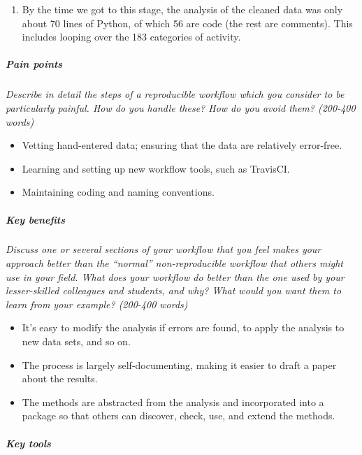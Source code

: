\documentclass[]{article}
\begin{document}
\begin{enumerate}
  \begin{enumerate}
  \def\labelenumii{\roman{enumii}.}
  \itemsep1pt\parskip0pt
  \item
    By the time we got to this stage, the analysis of the cleaned data
    was only about 70 lines of Python, of which 56 are code (the rest
    are comments). This includes looping over the 183 categories of
    activity.
  \end{enumerate}
\end{enumerate}

\subparagraph{Pain points}\label{pain-points}

\emph{Describe in detail the steps of a reproducible workflow which you
consider to be particularly painful. How do you handle these? How do you
avoid them? (200-400 words)}

\begin{itemize}
\itemsep1pt\parskip0pt
\item
  Vetting hand-entered data; ensuring that the data are relatively
  error-free.
\item
  Learning and setting up new workflow tools, such as TravisCI.
\item
  Maintaining coding and naming conventions.
\end{itemize}

\subparagraph{Key benefits}\label{key-benefits}

\emph{Discuss one or several sections of your workflow that you feel
makes your approach better than the ``normal'' non-reproducible workflow
that others might use in your field. What does your workflow do better
than the one used by your lesser-skilled colleagues and students, and
why? What would you want them to learn from your example? (200-400
words)}

\begin{itemize}
\itemsep1pt\parskip0pt
\item
  It's easy to modify the analysis if errors are found, to apply the
  analysis to new data sets, and so on.
\item
  The process is largely self-documenting, making it easier to draft a
  paper about the results.
\item
  The methods are abstracted from the analysis and incorporated into a
  package so that others can discover, check, use, and extend the
  methods.
\end{itemize}

\subparagraph{Key tools}\label{key-tools}
\end{document}
